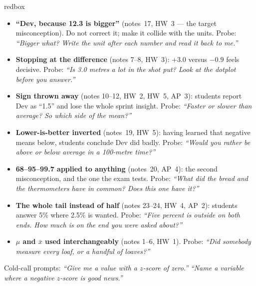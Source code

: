 \documentclass[10pt]{article}
\begin{document}
\boxguard
\begin{skillbox}{redbox}
\begin{itemize}[leftmargin=1.2em, nosep]
  \item \textbf{``Dev, because 12.3 is bigger''} (notes~17, HW~3 --- the target misconception).
        Do not correct it; make it collide with the units. Probe: \emph{``Bigger what? Write the
        unit after each number and read it back to me.''}
  \item \textbf{Stopping at the difference} (notes 7--8, HW~3): $+3.0$ versus $-0.9$ feels
        decisive. Probe: \emph{``Is 3.0 metres a lot in the shot put? Look at the dotplot before
        you answer.''}
  \item \textbf{Sign thrown away} (notes 10--12, HW~2, HW~5, AP~3): students report Dev as
        ``1.5'' and lose the whole sprint insight. Probe: \emph{``Faster or slower than average?
        So which side of the mean?''}
  \item \textbf{Lower-is-better inverted} (notes~19, HW~5): having learned that negative means
        below, students conclude Dev did badly. Probe: \emph{``Would you rather be above or below
        average in a 100-metre time?''}
  \item \textbf{68--95--99.7 applied to anything} (notes~20, AP~4): the second misconception, and
        the one the exam tests. Probe: \emph{``What did the bread and the thermometers have in
        common? Does this one have it?''}
  \item \textbf{The whole tail instead of half} (notes 23--24, HW~4, AP~2): students answer 5\%
        where 2.5\% is wanted. Probe: \emph{``Five percent is outside on \emph{both} ends. How
        much is on the end you were asked about?''}
  \item \textbf{$\mu$ and $\bar x$ used interchangeably} (notes 1--6, HW~1). Probe:
        \emph{``Did somebody measure every loaf, or a handful of loaves?''}
\end{itemize}
Cold-call prompts: \emph{``Give me a value with a $z$-score of zero.''} \quad \emph{``Name a
variable where a negative $z$-score is good news.''}
\end{skillbox}
\end{document}
